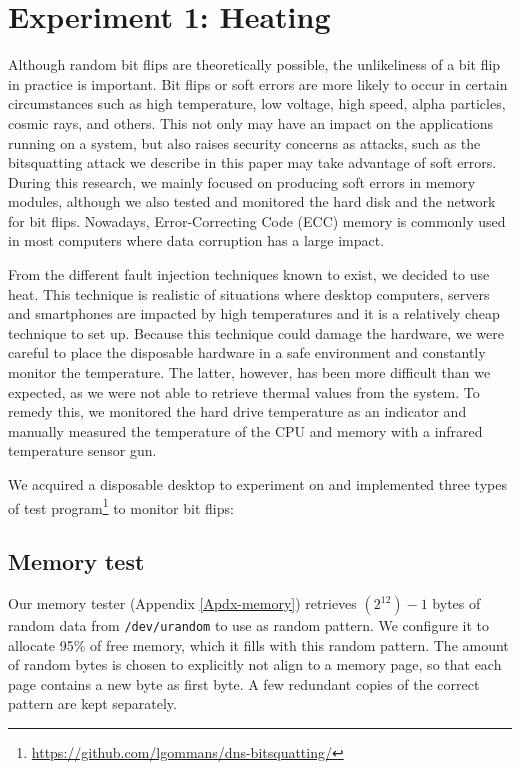 \documentclass[conference]{IEEEtran}
\begin{document}
\section{Experiment 1: Heating}

Although random bit flips are theoretically possible, the unlikeliness of a bit
flip in practice is important. Bit flips or soft errors are more likely to
occur in certain circumstances such as high temperature, low voltage, high
speed, alpha particles, cosmic rays, and others. This not only may have an
impact on the applications running on a system, but also raises security
concerns as attacks, such as the bitsquatting attack we describe in this paper
may take advantage of soft errors. During this research, we mainly focused on
producing soft errors in memory modules, although we also tested and monitored
the hard disk and the network for bit flips. Nowadays, Error-Correcting Code
(ECC) memory is commonly used in most computers where data corruption has a
large impact.

From the different fault injection techniques known to
exist\cite{barenghi2012fault}, we decided to use heat. This technique is
realistic of situations where desktop computers, servers and smartphones are
impacted by high temperatures and it is a relatively cheap technique to set up.
Because this technique could damage the hardware, we were careful to place the
disposable hardware in a safe environment and constantly monitor the
temperature. The latter, however, has been more difficult than we expected, as
we were not able to retrieve thermal values from the system. To remedy this, we
monitored the hard drive temperature as an indicator and manually measured the
temperature of the CPU and memory with a infrared temperature sensor gun.

We acquired a disposable desktop to experiment on and implemented three types
of test program\footnote{\url{https://github.com/lgommans/dns-bitsquatting/}}
to monitor bit flips:

\subsection{Memory test}

Our memory tester (Appendix \ref{Apdx-memory}) retrieves $(2^{12})-1$ bytes of
random data from \texttt{/dev/urandom} to use as random pattern. We configure
it to allocate 95\% of free memory, which it fills with this random pattern.
The amount of random bytes is chosen to explicitly not align to a memory page,
so that each page contains a new byte as first byte. A few redundant copies of
the correct pattern are kept separately.
\end{document}
